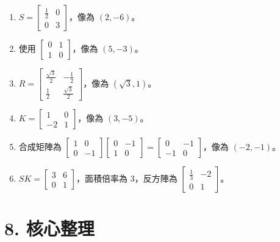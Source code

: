 \documentclass[11pt,a4paper]{article}
\providecommand{\tightlist}{%
  \setlength{\itemsep}{0pt}\setlength{\parskip}{0pt}}
\begin{document}
\begin{HandoutSelfCheck}
\begin{enumerate}
\def\labelenumi{\arabic{enumi}.}
\tightlist
\item
  \(S=\begin{bmatrix}\tfrac12&0\\0&3\end{bmatrix}\)，像為 \(\boxed{(2,-6)}\)。
\item
  使用 \(\begin{bmatrix}0&1\\1&0\end{bmatrix}\)，像為 \(\boxed{(5,-3)}\)。
\item
  \(R=\begin{bmatrix}\tfrac{\sqrt3}{2}&-\tfrac12\\\tfrac12&\tfrac{\sqrt3}{2}\end{bmatrix}\)，像為 \(\boxed{(\sqrt3,1)}\)。
\item
  \(K=\begin{bmatrix}1&0\\-2&1\end{bmatrix}\)，像為 \(\boxed{(3,-5)}\)。
\item
  合成矩陣為 \(\begin{bmatrix}1&0\\0&-1\end{bmatrix}\begin{bmatrix}0&-1\\1&0\end{bmatrix}=\begin{bmatrix}0&-1\\-1&0\end{bmatrix}\)，像為 \(\boxed{(-2,-1)}\)。
\item
  \(SK=\begin{bmatrix}3&6\\0&1\end{bmatrix}\)，面積倍率為 \(\boxed{3}\)，反方陣為 \(\boxed{\begin{bmatrix}\tfrac13&-2\\0&1\end{bmatrix}}\)。
\end{enumerate}

\end{HandoutSelfCheck}

\section{8. 核心整理}\label{ux6838ux5fc3ux6574ux7406}
\end{document}
